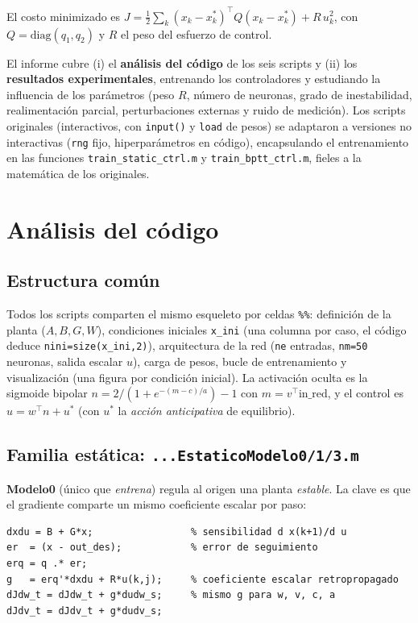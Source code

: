 \documentclass[11pt,a4paper]{article}
\newcommand{\code}[1]{\texttt{\small #1}}
\begin{document}
El costo minimizado es $J=\tfrac12\sum_k (x_k-x_k^*)^{\top}Q(x_k-x_k^*) + R\,u_k^2$,
con $Q=\mathrm{diag}(q_1,q_2)$ y $R$ el peso del esfuerzo de control.

El informe cubre (i) el \textbf{análisis del código} de los seis scripts y (ii) los
\textbf{resultados experimentales}, entrenando los controladores y estudiando la
influencia de los parámetros (peso $R$, número de neuronas, grado de inestabilidad,
realimentación parcial, perturbaciones externas y ruido de medición). Los scripts
originales (interactivos, con \code{input()} y \code{load} de pesos) se adaptaron a
versiones no interactivas (\code{rng} fijo, hiperparámetros en código),
encapsulando el entrenamiento en las funciones \code{train\_static\_ctrl.m} y
\code{train\_bptt\_ctrl.m}, fieles a la matemática de los originales.

\section{Análisis del código}

\subsection{Estructura común}
Todos los scripts comparten el mismo esqueleto por celdas \code{\%\%}: definición de la
planta ($A,B,G,W$), condiciones iniciales \code{x\_ini} (una columna por caso, el código
deduce \code{nini=size(x\_ini,2)}), arquitectura de la red (\code{ne} entradas,
\code{nm=50} neuronas, salida escalar $u$), carga de pesos, bucle de entrenamiento y
visualización (una figura por condición inicial). La activación oculta es la sigmoide
bipolar $n=2/(1+e^{-(m-c)/a})-1$ con $m=v^{\top}\text{in\_red}$, y el control es
$u=w^{\top}n + u^*$ (con $u^*$ la \emph{acción anticipativa} de equilibrio).

\subsection{Familia estática: \texttt{...EstaticoModelo0/1/3.m}}
\textbf{Modelo0} (único que \emph{entrena}) regula al origen una planta \emph{estable}.
La clave es que el gradiente comparte un mismo coeficiente escalar por paso:

\begin{lstlisting}[caption={Gradiente estático: solo el término instantáneo \texttt{dxdu}.}]
dxdu = B + G*x;                 % sensibilidad d x(k+1)/d u
er  = (x - out_des);            % error de seguimiento
erq = q .* er;
g   = erq'*dxdu + R*u(k,j);     % coeficiente escalar retropropagado
dJdw_t = dJdw_t + g*dudw_s;     % mismo g para w, v, c, a
dJdv_t = dJdv_t + g*dudv_s;
\end{lstlisting}
\end{document}
